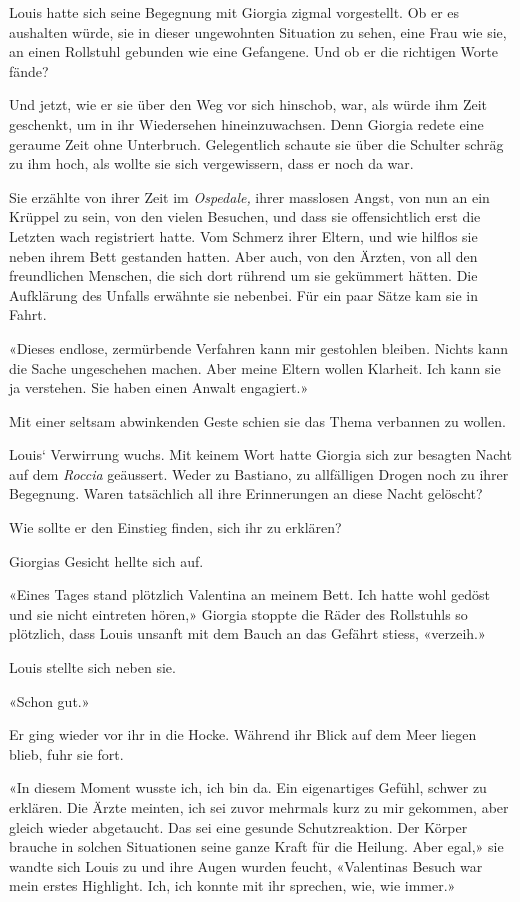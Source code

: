 Louis hatte sich seine Begegnung mit Giorgia zigmal vorgestellt. Ob er
es aushalten würde, sie in dieser ungewohnten Situation zu sehen, eine
Frau wie sie, an einen Rollstuhl gebunden wie eine Gefangene. Und ob er
die richtigen Worte fände?

Und jetzt, wie er sie über den Weg vor sich hinschob, war, als würde ihm
Zeit geschenkt, um in ihr Wiedersehen hineinzuwachsen. Denn Giorgia
redete eine geraume Zeit ohne Unterbruch. Gelegentlich schaute sie über
die Schulter schräg zu ihm hoch, als wollte sie sich vergewissern, dass
er noch da war.

Sie erzählte von ihrer Zeit im \emph{Ospedale,} ihrer masslosen Angst,
von nun an ein Krüppel zu sein, von den vielen Besuchen, und dass sie
offensichtlich erst die Letzten wach registriert hatte. Vom Schmerz
ihrer Eltern, und wie hilflos sie neben ihrem Bett gestanden hatten.
Aber auch, von den Ärzten, von all den freundlichen Menschen, die sich
dort rührend um sie gekümmert hätten. Die Aufklärung des Unfalls
erwähnte sie nebenbei. Für ein paar Sätze kam sie in Fahrt.

«Dieses endlose, zermürbende Verfahren kann mir gestohlen
bleiben\emph{.} Nichts kann die Sache ungeschehen machen. Aber meine
Eltern wollen Klarheit. Ich kann sie ja verstehen. Sie haben einen
Anwalt engagiert.»

Mit einer seltsam abwinkenden Geste schien sie das Thema verbannen zu
wollen.

Louis` Verwirrung wuchs. Mit keinem Wort hatte Giorgia sich zur besagten
Nacht auf dem \emph{Roccia} geäussert. Weder zu Bastiano, zu allfälligen
Drogen noch zu ihrer Begegnung. Waren tatsächlich all ihre Erinnerungen
an diese Nacht gelöscht?

Wie sollte er den Einstieg finden, sich ihr zu erklären?

Giorgias Gesicht hellte sich auf.

«Eines Tages stand plötzlich Valentina an meinem Bett. Ich hatte wohl
gedöst und sie nicht eintreten hören,» Giorgia stoppte die Räder des
Rollstuhls so plötzlich, dass Louis unsanft mit dem Bauch an das Gefährt
stiess, «verzeih.»

Louis stellte sich neben sie.

«Schon gut.»

Er ging wieder vor ihr in die Hocke. Während ihr Blick auf dem Meer
liegen blieb, fuhr sie fort.

«In diesem Moment wusste ich, ich bin da. Ein eigenartiges Gefühl,
schwer zu erklären. Die Ärzte meinten, ich sei zuvor mehrmals kurz zu
mir gekommen, aber gleich wieder abgetaucht. Das sei eine gesunde
Schutzreaktion. Der Körper brauche in solchen Situationen seine ganze
Kraft für die Heilung. Aber egal,» sie wandte sich Louis zu und ihre
Augen wurden feucht, «Valentinas Besuch war mein erstes Highlight. Ich,
ich konnte mit ihr sprechen, wie, wie immer.»

